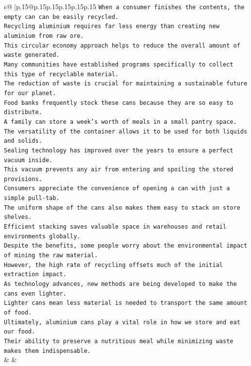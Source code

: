 \documentclass{article}
\begin{document}
{\begin{supertabular}{c@{$\;$}|p{.15\linewidth}@{}p{.15\linewidth}p{.15\linewidth}p{.15\linewidth}p{.15\linewidth}p{.15\linewidth}}
{{{\texttt{When a consumer finishes the contents, the empty can can be easily recycled.} \\
\texttt{Recycling aluminium requires far less energy than creating new aluminium from raw ore.} \\
\texttt{This circular economy approach helps to reduce the overall amount of waste generated.} \\
\texttt{Many communities have established programs specifically to collect this type of recyclable material.} \\
\texttt{The reduction of waste is crucial for maintaining a sustainable future for our planet.} \\
\texttt{Food banks frequently stock these cans because they are so easy to distribute.} \\
\texttt{A family can store a week's worth of meals in a small pantry space.} \\
\texttt{The versatility of the container allows it to be used for both liquids and solids.} \\
\texttt{Sealing technology has improved over the years to ensure a perfect vacuum inside.} \\
\texttt{This vacuum prevents any air from entering and spoiling the stored provisions.} \\
\texttt{Consumers appreciate the convenience of opening a can with just a simple pull{-}tab.} \\
\texttt{The uniform shape of the cans also makes them easy to stack on store shelves.} \\
\texttt{Efficient stacking saves valuable space in warehouses and retail environments globally.} \\
\texttt{Despite the benefits, some people worry about the environmental impact of mining the raw material.} \\
\texttt{However, the high rate of recycling offsets much of the initial extraction impact.} \\
\texttt{As technology advances, new methods are being developed to make the cans even lighter.} \\
\texttt{Lighter cans mean less material is needed to transport the same amount of food.} \\
\texttt{Ultimately, aluminium cans play a vital role in how we store and eat our food.} \\
\texttt{Their ability to preserve a nutritious meal while minimizing waste makes them indispensable.} \\
            }
        }
    }
    & & \\ \\


\end{supertabular}}
\end{document}
